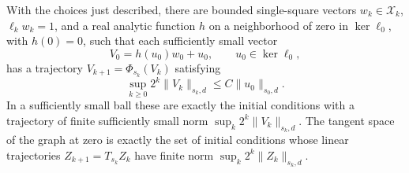 \begin{lemma}\label{lem:flow-stable-graph}
With the choices just described, there are bounded single-square vectors
\(w_k\in\mathcal X_k\), \(\ell_kw_k=1\), and a real analytic function
\(h\) on a neighborhood of zero in \(\ker\ell_0\), with \(h(0)=0\),
such that each sufficiently small vector
\begin{equation}\label{eq:flow-graph}
 V_0=h(u_0)w_0+u_0,\qquad u_0\in\ker\ell_0,
\end{equation}
has a trajectory \(V_{k+1}=\Phi_{s_k}(V_k)\) satisfying
\[
 \sup_{k\ge0}2^k\|V_k\|_{s_k,d}\le C\|u_0\|_{s_0,d}.
\]
In a sufficiently small ball these are exactly the initial conditions
with a trajectory of finite sufficiently small norm
\(\sup_k2^k\|V_k\|_{s_k,d}\).  The tangent space of the graph at zero is
exactly the set of initial conditions whose linear trajectories
\(Z_{k+1}=T_{s_k}Z_k\) have finite norm
\(\sup_k2^k\|Z_k\|_{s_k,d}\).
\end{lemma}

